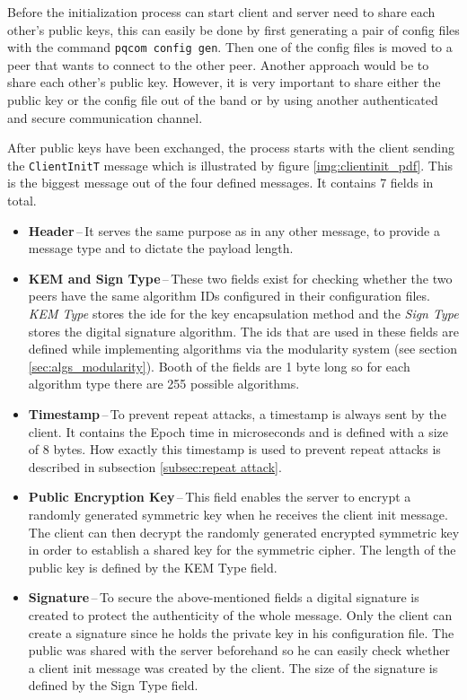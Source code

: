 Before the initialization process can start client and server need to share each other's public keys, this can easily be done by first generating a pair of config files with the command \texttt{pqcom config gen}. Then one of the config files is moved to a peer that wants to connect to the other peer. Another approach would be to share each other's public key. However, it is very important to share either the public key or the config file out of the band or by using another authenticated and secure communication channel.

After public keys have been exchanged, the process starts with the client sending the \texttt{ClientInitT} message which is illustrated by figure \ref{img:clientinit_pdf}. This is the biggest message out of the four defined messages. It contains 7 fields in total.
\begin{itemize}
  \item \textbf{Header}\,--\,It serves the same purpose as in any other message, to provide a message type and to dictate the payload length.
  \item \textbf{KEM and Sign Type}\,--\,These two fields exist for checking whether the two peers have the same algorithm IDs configured in their configuration files. \textit{KEM Type} stores the ide for the key encapsulation method and the \textit{Sign Type} stores the digital signature algorithm. The ids that are used in these fields are defined while implementing algorithms via the modularity system (see section \ref{sec:algs_modularity}). Booth of the fields are 1 byte long so for each algorithm type there are 255 possible algorithms.
  \item \textbf{Timestamp}\,--\,To prevent repeat attacks, a timestamp is always sent by the client. It contains the Epoch time in microseconds and is defined with a size of 8 bytes. How exactly this timestamp is used to prevent repeat attacks is described in subsection \ref{subsec:repeat attack}.
  \item \textbf{Public Encryption Key}\,--\,This field enables the server to encrypt a randomly generated symmetric key when he receives the client init message. The client can then decrypt the randomly generated encrypted symmetric key in order to establish a shared key for the symmetric cipher. The length of the public key is defined by the KEM Type field.
  \item \textbf{Signature}\,--\,To secure the above-mentioned fields a digital signature is created to protect the authenticity of the whole message. Only the client can create a signature since he holds the private key in his configuration file. The public was shared with the server beforehand so he can easily check whether a client init message was created by the client. The size of the signature is defined by the Sign Type field.
\end{itemize}

